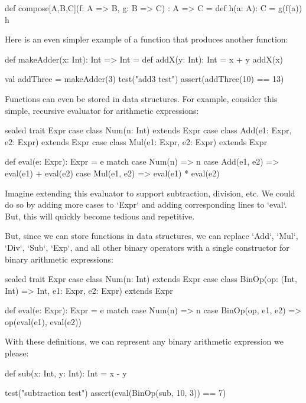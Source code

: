\documentclass{book}
\begin{document}
\begin{scalacode}
def compose[A,B,C](f: A => B, g: B => C) : A => C = {
  def h(a: A): C = { g(f(a)) }
  h
}
\end{scalacode}

Here is an even simpler example of a function that produces another function:

\begin{scalacode}
def makeAdder(x: Int): Int => Int = {
  def addX(y: Int): Int = x + y
  addX(x)
}

val addThree = makeAdder(3)
test("add3 test") {
  assert(addThree(10) == 13)
}
\end{scalacode}

Functions can even be stored in data structures. For example, consider
this simple, recursive evaluator for arithmetic expressions:

\begin{scalacode}
sealed trait Expr
case class Num(n: Int) extends Expr
case class Add(e1: Expr, e2: Expr) extends Expr
case class Mul(e1: Expr, e2: Expr) extends Expr

def eval(e: Expr): Expr = e match {
  case Num(n) => n
  case Add(e1, e2) => eval(e1) + eval(e2)
  case Mul(e1, e2) => eval(e1) * eval(e2)
}
\end{scalacode}

Imagine extending this evaluator to support subtraction, division, etc.
We could do so by adding more cases to `Expr` and adding corresponding
lines to `eval`. But, this will quickly become tedious and repetitive.

But, since we can store functions in data structures, we can replace
`Add`, `Mul`, `Div`, `Sub`, `Exp`, and all other binary operators with
a single constructor for binary arithmetic expressions:

\begin{scalacode}
sealed trait Expr
case class Num(n: Int) extends Expr
case class BinOp(op: (Int, Int) => Int, e1: Expr, e2: Expr) extends Expr

def eval(e: Expr): Expr = e match {
  case Num(n) => n
  case BinOp(op, e1, e2) => op(eval(e1), eval(e2))
}
\end{scalacode}

With these definitions, we can represent any binary arithmetic expression
we please:

\begin{scalacode}
def sub(x: Int, y: Int): Int = x - y

test("subtraction test") {
  assert(eval(BinOp(sub, 10, 3)) == 7)
}
\end{scalacode}
\end{document}
